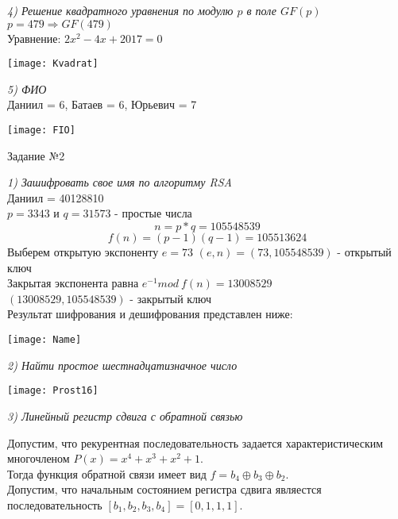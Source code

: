 \emph {4) Решение квадратного уравнения по модулю $p$ в поле $GF(p)$}\\
$p = 479 \Rightarrow GF(479)$\\
Уравнение: $2x^2 -4x + 2017 = 0$\\

\begin{center}
  \texttt{[image: Kvadrat]}
\end{center}

\emph {5) ФИО}\\
Даниил = 6, Батаев = 6, Юрьевич = 7\\

\begin{center}
  \texttt{[image: FIO]}
\end{center}

\begin{title}
  Задание №2
\end{title}

\emph {1) Зашифровать свое имя по алгоритму RSA}\\
Даниил = 40128810\\

$p = 3343$ и $q = 31573$ - простые числа\\
\[n = p*q = 105548539\]
\[f(n) = (p - 1)(q - 1) = 105513624\]
Выберем открытую экспоненту $e = 73$
$(e, n) = (73 , 105548539)$ - открытый ключ\\
Закрытая экспонента равна $e^{-1} mod ~ f(n) = 13008529$\\
$(13008529, 105548539)$ - закрытый ключ\\
Результат шифрования и дешифрования представлен ниже:\\

\begin{center}
  \texttt{[image: Name]}
\end{center}

\emph {2) Найти простое шестнадцатизначное число}\\

\begin{center}
  \texttt{[image: Prost16]}
\end{center}

\emph {3) Линейный регистр сдвига с обратной связью}

Допустим, что рекурентная последовательность задается характеристическим
многочленом
$P(x) = x^4 + x^3 + x^2 + 1$.\\
Тогда функция обратной связи имеет вид $f = b_4 \oplus b_3 \oplus b_2$.\\
Допустим, что начальным состоянием регистра сдвига являестся последовательность
$[b_1, b_2, b_3, b_4] = [0, 1, 1, 1]$.\\

